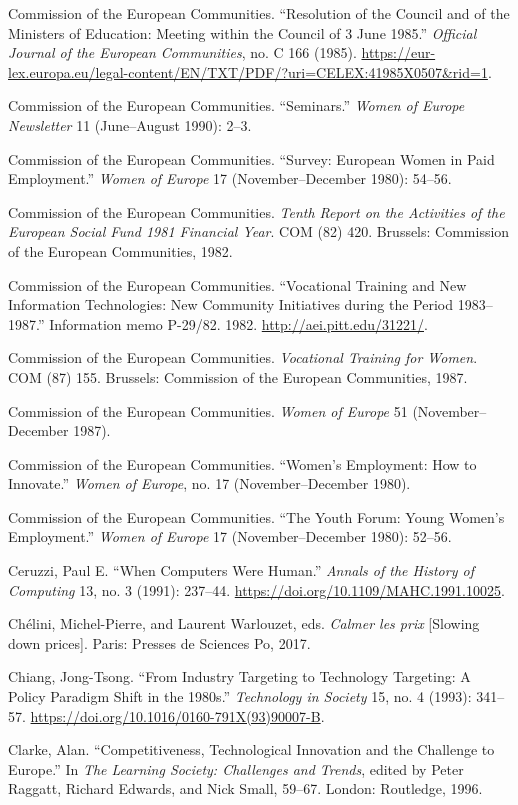 \documentclass{tufte-handout}
\begin{document}
\begin{hangparas}{.25in}{1}
Commission of the European Communities. ``Resolution of the Council and
of the Ministers of Education: Meeting within the Council of 3 June
1985.'' \emph{Official Journal of the European Communities}, no. C 166
(1985).
\url{https://eur-lex.europa.eu/legal-content/EN/TXT/PDF/?uri=CELEX:41985X0507\&rid=1}.

Commission of the European Communities. ``Seminars.'' \emph{Women of
Europe Newsletter} 11 (June--August 1990): 2--3.

Commission of the European Communities. ``Survey: European Women in Paid
Employment.'' \emph{Women of Europe} 17 (November--December 1980):
54--56.

Commission of the European Communities. \emph{Tenth Report on the
Activities of the European Social Fund 1981 Financial Year}. COM (82)
420. Brussels: Commission of the European Communities, 1982.

Commission of the European Communities. ``Vocational Training and New
Information Technologies: New Community Initiatives during the Period
1983--1987.'' Information memo P-29/82. 1982.
\url{http://aei.pitt.edu/31221/}.

Commission of the European Communities. \emph{Vocational Training for
Women}. COM (87) 155. Brussels: Commission of the European Communities,
1987.

Commission of the European Communities. \emph{Women of Europe} 51
(November--December 1987).

Commission of the European Communities. ``Women's Employment: How to
Innovate.'' \emph{Women of Europe}, no. 17 (November--December 1980).

Commission of the European Communities. ``The Youth Forum: Young Women's
Employment.'' \emph{Women of Europe} 17 (November--December 1980):
52--56.

Ceruzzi, Paul E. ``When Computers Were Human.'' \emph{Annals of the
History of Computing} 13, no. 3 (1991): 237--44.
\url{https://doi.org/10.1109/MAHC.1991.10025}.

Chélini, Michel-Pierre, and Laurent Warlouzet, eds. \emph{Calmer les
prix} {[}Slowing down prices{]}. Paris: Presses de Sciences Po, 2017.

Chiang, Jong-Tsong. ``From Industry Targeting to Technology Targeting: A
Policy Paradigm Shift in the 1980s.'' \emph{Technology in Society} 15,
no. 4 (1993): 341--57.
\url{https://doi.org/10.1016/0160-791X(93)90007-B}.

Clarke, Alan. ``Competitiveness, Technological Innovation and the
Challenge to Europe.'' In \emph{The Learning Society: Challenges and
Trends}, edited by Peter Raggatt, Richard Edwards, and Nick Small,
59--67. London: Routledge, 1996.


\end{hangparas}
\end{document}

